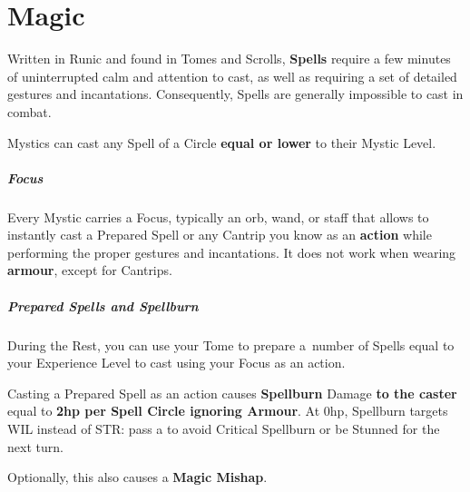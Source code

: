 \documentclass[itdr/core]{subfiles}
\begin{document}
\chapter{Magic}
\label{ch:magic}

Written in Runic and found in Tomes and Scrolls, \textbf{Spells} require a few minutes of uninterrupted calm and attention to cast, as well as requiring a set of detailed gestures and incantations. Consequently, Spells are generally impossible to cast in combat.

Mystics can cast any Spell of a Circle \textbf{equal or lower} to their Mystic Level.

\paragraph{Focus}
Every Mystic carries a Focus, typically an orb, wand, or staff that allows to instantly cast a Prepared Spell or any Cantrip you know as an \textbf{action} while performing the proper gestures and incantations. It does not work when wearing \textbf{armour}, \mbox{except} for Cantrips.

\paragraph{Prepared Spells and Spellburn}
During the Rest, you can use your Tome to prepare a~number of Spells equal to your Experience Level to cast using your Focus as an action.

Casting a Prepared Spell as an action causes \mbox{\textbf{Spellburn}} \mbox{Damage} \textbf{to the caster} equal to \textbf{2hp per Spell Circle ignoring Armour}. At 0hp, Spellburn targets WIL \mbox{instead} of STR: pass a  to avoid Critical Spellburn or be Stunned for the next turn.

\vspace{-0.5ex}
\begin{dbox}
	Optionally, this also causes a \textbf{Magic Mishap}\footnotemark[1].
\end{dbox}
\vspace{-0.5ex}

\end{document}
